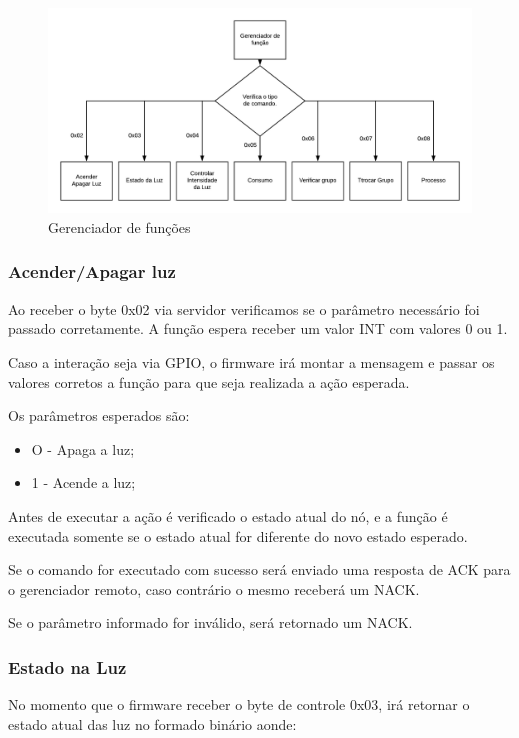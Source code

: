 \documentclass[openright]{normas-utf-tex} %
\begin{document}
\begin{figure}[!htb]
     \centering
     \includegraphics[scale=0.7]{3_flux.png}
     \caption{Gerenciador de funções}
     \label{}
\end{figure}


\subsubsection{Acender/Apagar luz}

Ao receber o byte 0x02 via servidor verificamos se o parâmetro necessário foi passado corretamente. A função espera receber um valor INT com valores 0 ou 1.

Caso a interação seja via GPIO, o firmware irá montar a mensagem e passar os valores corretos a função para que seja realizada a ação esperada.

Os parâmetros esperados são:
\begin{itemize}
    \item O - Apaga a luz;
    \item 1 - Acende a luz;
\end{itemize}

Antes de executar a ação é verificado o estado atual do nó, e a função é executada somente se o estado atual for diferente do novo estado esperado.

Se o comando for executado com sucesso será enviado uma resposta de ACK para o gerenciador remoto, caso contrário o mesmo receberá um NACK.

Se o parâmetro informado for inválido, será retornado um NACK.

\subsubsection{Estado na Luz}

No momento que o firmware receber o byte de controle 0x03, irá retornar o estado atual das luz no formado binário aonde:
\end{document}
